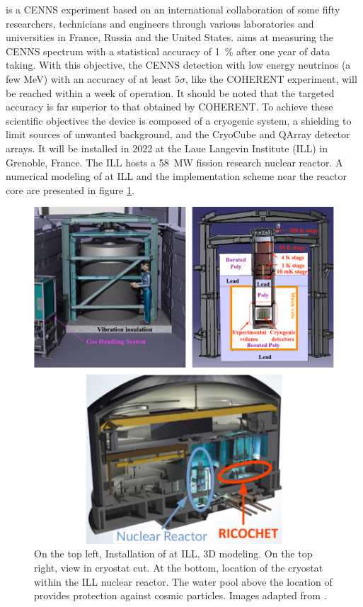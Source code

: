 \Ricochet{} is a CENNS experiment based on an international collaboration of
some fifty researchers, technicians and engineers through various laboratories and universities in France, Russia and the United States. \Ricochet{} aims at measuring the CENNS spectrum with a statistical accuracy of \SI{1}{\percent} after one year of data taking. With this objective, the CENNS detection with low energy neutrinos (a few \si{\mega\eV}) with an accuracy of at least $5\sigma$, like the COHERENT experiment, will be reached within a week of operation. 
It should be noted that the targeted accuracy is far superior to that obtained by COHERENT. To achieve these scientific objectives the \Ricochet{} device is composed of a cryogenic system, a shielding to limit sources of unwanted background, and the CryoCube and QArray detector arrays. It will be installed in 2022 at the Laue Langevin Institute (ILL) in Grenoble, France. The ILL hosts a \SI{58}{\mega\watt} fission research nuclear reactor. A numerical modeling of \Ricochet{} at ILL and the implementation scheme near the reactor core are presented in figure \ref{fig:ricochet-ill-site}.

\begin{figure}
\centering
\includegraphics[scale=1]{Figures/Introduction/ricochet_ill_site.pdf}
\caption{On the top left, Installation of \Ricochet{} at ILL, 3D modeling. On the top right, view in
cryostat cut. At the bottom, location of the \Ricochet{} cryostat within the ILL nuclear reactor. The water pool above the location of \Ricochet{} provides protection against cosmic particles. Images adapted from \cite{HDRJulien}.}
\label{fig:ricochet-ill-site}
\end{figure}

